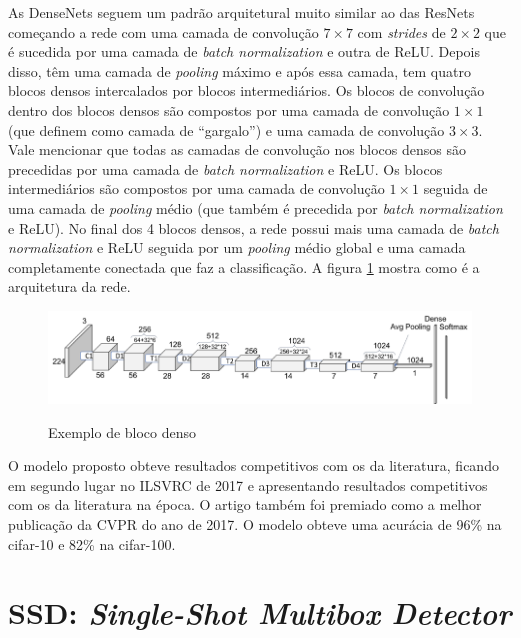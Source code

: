 As \ac{DenseNet}s seguem um padrão arquitetural muito similar ao das \ac{ResNet}s começando a rede com uma camada de convolução $7\times7$ com \textit{strides} de $2\times2$ que é sucedida por uma camada de \textit{batch normalization} e outra de \ac{ReLU}. Depois disso, têm uma camada de \textit{pooling} máximo e após essa camada, tem quatro blocos densos intercalados por blocos intermediários. Os blocos de convolução dentro dos blocos densos são compostos por uma camada de convolução $1\times1$ (que \citeauthor{liu-2017} definem como camada de ``gargalo'') e uma camada de convolução $3\times3$. Vale mencionar que todas as camadas de convolução nos blocos densos são precedidas por uma camada de \textit{batch normalization} e \ac{ReLU}. Os blocos intermediários são compostos por uma camada de convolução $1\times1$ seguida de uma camada de \textit{pooling} médio (que também é precedida por \textit{batch normalization} e \ac{ReLU}). No final dos 4 blocos densos, a rede possui mais uma camada de \textit{batch normalization} e \ac{ReLU} seguida por um \textit{pooling} médio global e uma camada completamente conectada que faz a classificação. A figura \ref{fig:archdensenet} mostra como é a arquitetura da rede.

\begin{figure}[H]
	\setlength{\abovecaptionskip}{0pt}
	\setlength{\belowcaptionskip}{0pt}
	\caption[Exemplo de bloco denso]{Exemplo de bloco denso}
	\centering
	\includegraphics[width=.7\textwidth]{imagem/0x_densenet_arch.png}
	\captionsetup{justification=centering}
	\label{fig:archdensenet}
\end{figure}

O modelo proposto obteve resultados competitivos com os da literatura, ficando em segundo lugar no \ac{ILSVRC} de 2017 e apresentando resultados competitivos com os da literatura na época. O artigo também foi premiado como a melhor publicação da \ac{CVPR} do ano de 2017. O modelo obteve uma acurácia de 96\% na cifar-10 e 82\% na cifar-100.

\section{SSD: \textit{Single-Shot Multibox Detector}}


